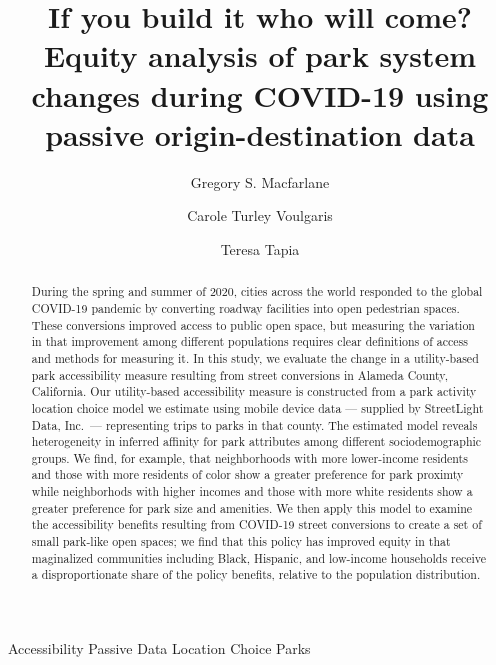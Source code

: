 \documentclass[3p, authoryear, review]{elsarticle} %
\begin{document}
\begin{frontmatter}

  \title{If you build it who will come? Equity analysis of park system changes during COVID-19 using passive origin-destination data}
    \author[BYU]{Gregory S. Macfarlane}
    \author[Harvard]{Carole Turley Voulgaris}
    \author[StreetLight]{Teresa Tapia}
      \address[BYU]{Brigham Young University, Civil and Environmental Engineering Department, 430 Engineering Building, Provo, Utah 84602}
    \address[Harvard]{Harvard Graduate School of Design, 48 Quincy St, Cambridge, Massachussetts 02138}
    \address[StreetLight]{StreetLight Data, Inc., San Francisco, California}
  
  \begin{abstract}
  During the spring and summer of 2020, cities across the world responded to the global COVID-19 pandemic by converting roadway facilities into open pedestrian spaces. These conversions improved access to public open space, but measuring the variation in that improvement among different populations requires clear definitions of access and methods for measuring it. In this study, we evaluate the change in a utility-based park accessibility measure resulting from street conversions in Alameda County, California. Our utility-based accessibility measure is constructed from a park activity location choice model we estimate using mobile device data --- supplied by StreetLight Data, Inc.~--- representing trips to parks in that county. The estimated model reveals heterogeneity in inferred affinity for park attributes among different sociodemographic groups. We find, for example, that neighborhoods with more lower-income residents and those with more residents of color show a greater preference for park proximty while neighborhods with higher incomes and those with more white residents show a greater preference for park size and amenities. We then apply this model to examine the accessibility benefits resulting from COVID-19 street conversions to create a set of small park-like open spaces; we find that this policy has improved equity in that maginalized communities including Black, Hispanic, and low-income households receive a disproportionate share of the policy benefits, relative to the population distribution.
  \end{abstract}
   \begin{keyword} Accessibility Passive Data Location Choice Parks\end{keyword}
 \end{frontmatter}
\end{document}
